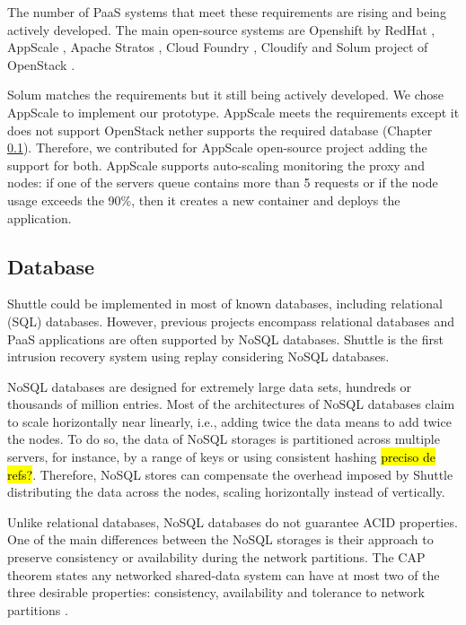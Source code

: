 The number of \acf{PaaS} systems that meet these requirements are rising and being actively developed. The main open-source systems are Openshift by RedHat \cite{OpenShift}, AppScale \cite{Appscale}, Apache Stratos \cite{ApacheStratos}, Cloud Foundry \cite{Cloudfoundry}, Cloudify \cite{cloudify} and Solum project of OpenStack \cite{solum}.  

Solum matches the requirements but it still being actively developed. We chose AppScale \cite{Appscale} to implement our prototype. AppScale meets the requirements except it does not support OpenStack nether supports the required database (Chapter \ref{sec:impl:database_options}).  Therefore, we contributed for AppScale open-source project adding the support for both. AppScale supports auto-scaling monitoring the proxy and nodes: if one of the servers queue contains more than 5 requests or if the node usage exceeds the 90\%, then it creates a new container and deploys the application.

\subsection{Database}\label{sec:impl:database_options}
Shuttle could be implemented in most of known databases, including relational (\ac{SQL}) databases. However, previous projects encompass relational databases \cite{warp,goel} and \ac{PaaS} applications are often supported by \acs{NoSQL} databases. Shuttle is the first intrusion recovery system using replay considering \acs{NoSQL} databases.

\acs{NoSQL} databases are designed for extremely large data sets, hundreds or thousands of million entries. Most of the architectures of \acs{NoSQL} databases claim to scale horizontally near linearly, i.e., adding twice the data means to add twice the nodes. To do so, the data of \acs{NoSQL} storages is partitioned across multiple servers, for instance, by a range of keys or using consistent hashing \hl{preciso de refs?}. Therefore, \acs{NoSQL} stores can compensate the overhead imposed by Shuttle distributing the data across the nodes, scaling horizontally instead of vertically. 


Unlike relational databases, \acs{NoSQL} databases do not guarantee \acf{ACID} properties. One of the main differences between the \acs{NoSQL} storages is their approach to preserve consistency or availability during the network partitions. The \acs{CAP} theorem states any networked shared-data system can have at most two of the three desirable properties: consistency, availability and tolerance to network partitions \cite{brewer2012cap}.

